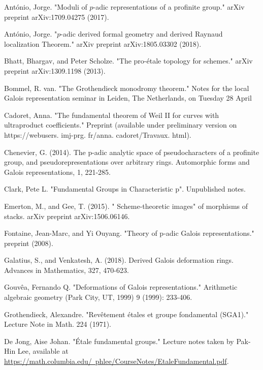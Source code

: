 \documentclass[10pt,a4paper]{amsart}
\numberwithin{equation}{subsection}
\theoremstyle{plain}
\theoremstyle{definition}
\theoremstyle{remark}
\numberwithin{equation}{section}
\begin{document}
\begin{thebibliography}{10}
Ant\'onio, Jorge. "Moduli of $ p $-adic representations of a profinite group." arXiv preprint arXiv:1709.04275 (2017).

Ant\'onio, Jorge. "$ p $-adic derived formal geometry and derived Raynaud localization Theorem." arXiv preprint arXiv:1805.03302 (2018).

Bhatt, Bhargav, and Peter Scholze. "The pro-\'etale topology for schemes." arXiv preprint arXiv:1309.1198 (2013).

Bommel, R. van. "The Grothendieck monodromy theorem." Notes for the local Galois representation seminar in Leiden, The Netherlands, on Tuesday 28 April

Cadoret, Anna. "The fundamental theorem of Weil II for curves with ultraproduct coefficients." Preprint (available under preliminary version on https://webusers. imj-prg. fr/anna. cadoret/Travaux. html).

Chenevier, G. (2014). The p-adic analytic space of pseudocharacters of a profinite group, and pseudorepresentations over arbitrary rings. Automorphic forms and Galois representations, 1, 221-285.

Clark, Pete L. "Fundamental Groups in Characteristic p". Unpublished notes.

Emerton, M., and Gee, T. (2015). " Scheme-theoretic images" of morphisms of stacks. arXiv preprint arXiv:1506.06146.

Fontaine, Jean-Marc, and Yi Ouyang. "Theory of p-adic Galois representations." preprint (2008).

Galatius, S., and Venkatesh, A. (2018). Derived Galois deformation rings. Advances in Mathematics, 327, 470-623.

Gouv\^ea, Fernando Q. "Deformations of Galois representations." Arithmetic algebraic geometry (Park City, UT, 1999) 9 (1999): 233-406.


Grothendieck, Alexandre. "Rev\^etement \'etales et groupe fondamental (SGA1)." Lecture Note in Math. 224 (1971).

De Jong, Aise Johan. "\'Etale fundamental groups." Lecture notes taken by Pak-Hin Lee, available at \hyperref[deJong]{https://math.columbia.edu/~phlee/CourseNotes/EtaleFundamental.pdf}.


\end{thebibliography}
\end{document}
